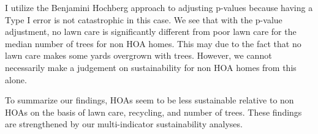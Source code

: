 \documentclass{article}
\begin{document}
I utilize the Benjamini Hochberg approach \citep{rcompanion} to adjusting p-values because having a Type I error is not catastrophic in this case. We see that with the p-value adjustment, no lawn care is significantly different from poor lawn care for the median number of trees for non HOA homes. This may due to the fact that no lawn care makes some yards overgrown with trees. However, we cannot necessarily make a judgement on sustainability for non HOA homes from this alone. 

To summarize our findings, HOAs seem to be less sustainable relative to non HOAs on the basis of lawn care, recycling, and number of trees. These findings are strengthened by our multi-indicator sustainability analyses. 
\newpage

\end{document}
